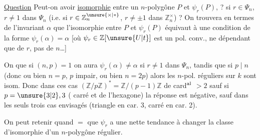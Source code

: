 \uline{Question} Peut-on avoir \uline{isomorphie} entre un $n$-polygône  $P$ et $\psi_r(P)$, ? si $r\in\Psi_n$, $r\neq1$ dans $\Psi_n$ (i.e. si $r\in\mathbb Z_n^{\unsure{\times|*}}$, $r\neq\pm1$ dans $\mathbb Z_n^\times$) ? On trouvera
en termes de l'invariant $\alpha$ que  l'isomorphie entre $P$ et $\psi_r(P)$ équivaut à une condition de la forme $\psi_r(\alpha)=\alpha$ [où $\psi_r\in\mathbb Z[\unsure{U|t}]$ est un pol. conv., \deleted{\unsure{\}}} ne dépendant que de $r$, pas de $n$\ldots]

On  que  si $(n,p)=1$ on aura $\psi_r(\alpha)\neq\alpha$ si $r\neq1$ dans $\Psi_n$, tandis que si  $p\mid n$ (donc ou bien $n=p$, $p$ impair, ou bien $n=2p$) alors  les $n$-pol. réguliers sur $k$ sont isom.  Donc dans ces cas   $(\mathbb Z/p\mathbb Z)^*=\mathbb Z/(p-1)\mathbb Z$ de card$^{\rm al}$  $>2$  sauf si $p=\unsure{3|2},3$ (   carré et de l'hexagone) la réponse est négative, sauf dans les seuls  trois cas envisagés (triangle  en car. 3, carré en car. 2).

On peut retenir quand $=$ que $\psi_r$ a une nette tendance à changer la classe d'isomorphie d'un $n$-polygône régulier.

